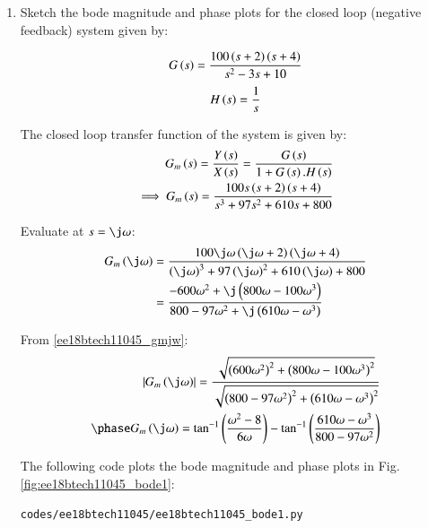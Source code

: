 \begin{enumerate}[label=\thesubsection.\arabic*.,ref=\thesubsection.\theenumi]

\item Sketch the bode magnitude and phase plots for the closed loop (negative feedback) system given by:

\begin{align}
    G\left(s\right) = \frac{100\left(s+2\right)\left(s+4\right)}{s^2 - 3s + 10}
    \label{ee18btech11045_gs}
\end{align}
\begin{align}
    H\left(s\right) = \frac{1}{s}
\end{align}

\solution
The closed loop transfer function of the system is given by:
\begin{align}
    G_m\left(s\right) = \frac{Y\left(s\right)}{X\left(s\right)} = \frac{G\left(s\right)}{1 + G\left(s\right).H\left(s\right)}
    \\
    \implies G_m\left(s\right) = \frac{100s\left(s+2\right)\left(s+4\right)}{s^3 + 97s^2 + 610s + 800}
    \label{ee18btech11045_gm}
\end{align}

Evaluate at $s = \j\omega$:
\begin{align}
    G_m\brak{\j\omega} &= \frac{100\j\omega\brak{\j\omega+2}\brak{\j\omega+4}}{\brak{\j\omega}^3 + 97\brak{\j\omega}^2 + 610\brak{\j\omega} + 800}
    \\
    &= \frac{-600\omega^2 + \j\brak{800\omega - 100\omega^3}}{800 - 97\omega^2 + \j\brak{610\omega - \omega^3}}
    \label{ee18btech11045_gmjw}
\end{align}

From \eqref{ee18btech11045_gmjw}:
\begin{align}
    \abs{G_m\brak{\j\omega}} = \frac{\sqrt{\brak{600\omega^2}^2 + \brak{800\omega-100\omega^3}^2}}{\sqrt{\brak{800 - 97\omega^2}^2+\brak{610\omega-\omega^3}^2}}
    \\
    \phase G_m\brak{\j\omega} = \tan^{-1}\brak{\frac{\omega^2 - 8}{6\omega}}
    -\tan^{-1}\brak{\frac{610\omega-\omega^3}{800-97\omega^2}}
\end{align}
    
The following code plots the bode magnitude and phase plots in Fig. \ref{fig:ee18btech11045_bode1}:

\begin{lstlisting}
codes/ee18btech11045/ee18btech11045_bode1.py
\end{lstlisting}


\end{enumerate}
